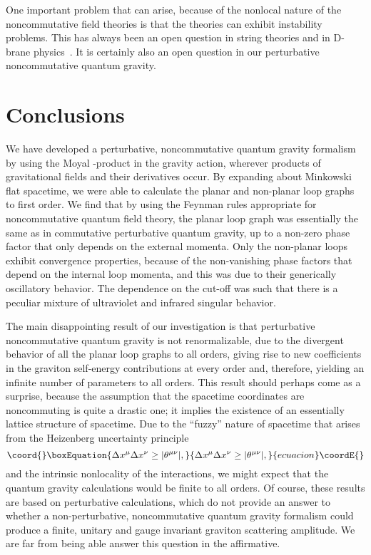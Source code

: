 \documentclass[a4paper,10pt]{article}
\begin{document}
One important problem that can arise, because
of the nonlocal nature of the noncommutative field theories is that
the theories can exhibit instability problems. This has
always been an open question in string theories and in D-brane
physics~\cite{Eliezer,Kamimura,Douglas}. It is certainly also an open question in
our perturbative noncommutative quantum gravity.

\section{\bf Conclusions}

We have developed a perturbative, noncommutative quantum gravity formalism
by using the Moyal \myHighlight{$\star$}\coordHE{}-product in the gravity action, wherever products
of gravitational fields and their derivatives occur. By expanding about
Minkowski flat spacetime, we were able to calculate the planar and
non-planar loop graphs to first order. We find that by using the Feynman
rules appropriate for noncommutative quantum field theory, the planar
loop graph was essentially the same as in commutative perturbative quantum
gravity, up to a non-zero phase factor that only depends on the external
momenta. Only the non-planar loops exhibit convergence properties,
because of the non-vanishing phase factors that depend on the internal loop
momenta, and this was due to their generically oscillatory behavior. The
dependence on the cut-off \coordHE{} was such that there is a
peculiar mixture of ultraviolet and infrared singular behavior.

The main disappointing result of our investigation is that perturbative
noncommutative quantum gravity is not renormalizable, due to the divergent
behavior of all the planar loop graphs to all orders, giving rise to new
coefficients in the graviton self-energy contributions at every order
and, therefore, yielding an infinite number of parameters to all orders. This
result should perhaps come as a surprise, because the assumption that the
spacetime coordinates are noncommuting is quite a drastic one; it
implies the existence of an essentially lattice structure of spacetime.
Due to the ``fuzzy'' nature of spacetime that arises from the Heizenberg
uncertainty principle
\begin{equation}\coord{}\boxEquation{
\Delta x^\mu\Delta x^\nu \ge \vert\theta^{\mu\nu}\vert,
}{
\Delta x^\mu\Delta x^\nu \ge \vert\theta^{\mu\nu}\vert,
}{ecuacion}\coordE{}\end{equation}
and the intrinsic nonlocality of the interactions, we might expect that the
quantum gravity calculations would be finite to all orders. Of course,
these results are based on perturbative calculations, which do not
provide an answer to whether a non-perturbative, noncommutative quantum
gravity formalism could produce a finite, unitary and gauge invariant
graviton scattering amplitude. We are far from being able answer this
question in the affirmative.
\end{document}
